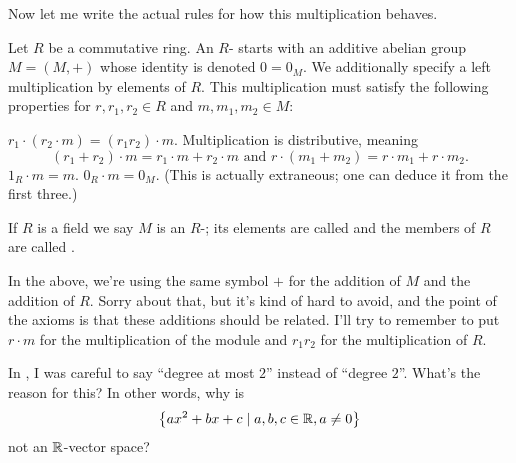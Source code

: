 Now let me write the actual rules for how this multiplication behaves.
\begin{definition}
	Let $R$ be a commutative ring.
	An $R$- starts with an additive abelian group $M = (M,+)$
	whose identity is denoted $0 = 0_M$.
	We additionally specify a left multiplication by elements of $R$.
	This multiplication must satisfy the following properties
	for $r, r_1, r_2 \in R$ and $m, m_1, m_2 \in M$:
	\begin{enumerate}[(i)]
		\ii $r_1 \cdot (r_2 \cdot m) = (r_1r_2) \cdot m$.
		\ii Multiplication is distributive, meaning
		\[ (r_1+r_2) \cdot m = r_1 \cdot m + r_2 \cdot m
			\text{ and }
			r \cdot (m_1 + m_2) = r \cdot m_1 + r \cdot m_2. \]
		\ii $1_R \cdot m = m$.
		\ii $0_R \cdot m = 0_M$.
		(This is actually extraneous;
		one can deduce it from the first three.)
	\end{enumerate}
	If $R$ is a field we say $M$ is an $R$-;
	its elements are called 
	and the members of $R$ are called .
\end{definition}

\begin{abuse}
	In the above, we're using the same symbol $+$ for the addition of $M$
	and the addition of $R$.
	Sorry about that, but it's kind of hard to avoid, and the point
	of the axioms is that these additions should be related.
	I'll try to remember to put $r \cdot m$ for the multiplication of the module
	and $r_1r_2$ for the multiplication of $R$.
\end{abuse}

\begin{ques}
	In ,
	I was careful to say ``degree at most $2$'' instead of ``degree $2$''.
	What's the reason for this?
	In other words, why is
	\[ \left\{ ax^2 + bx + c \mid a,b,c \in \mathbb R, a \neq 0  \right\} \]
	not an $\mathbb R$-vector space?
\end{ques}

